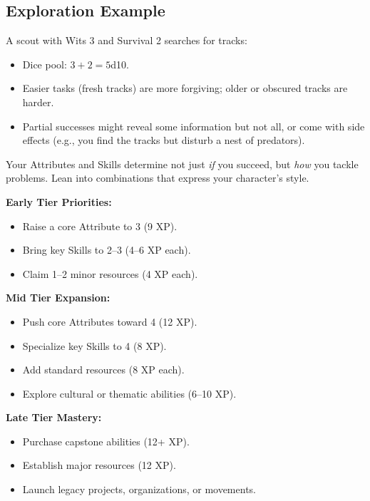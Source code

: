 \subsection{Exploration Example}
\label{sec:exploration-example}
A scout with Wits 3 and Survival 2 searches for tracks:
\begin{itemize}
  \item Dice pool: $3 + 2 = 5$d10.
  \item Easier tasks (fresh tracks) are more forgiving; older or obscured tracks are harder.
  \item Partial successes might reveal some information but not all, or come with side effects (e.g., you find the tracks but disturb a nest of predators).
\end{itemize}

\noindent Your Attributes and Skills determine not just \emph{if} you succeed, but
\emph{how} you tackle problems. Lean into combinations that express your
character's style.

\begin{tcolorbox}[colback=green!5!white,colframe=green!75!black,title=XP Planning Guide,fonttitle=\bfseries,breakable]
\textbf{Early Tier Priorities:}
\begin{itemize}
  \item Raise a core Attribute to 3 (9 XP).
  \item Bring key Skills to 2--3 (4--6 XP each).
  \item Claim 1--2 minor resources (4 XP each).
\end{itemize}

\textbf{Mid Tier Expansion:}
\begin{itemize}
  \item Push core Attributes toward 4 (12 XP).
  \item Specialize key Skills to 4 (8 XP).
  \item Add standard resources (8 XP each).
  \item Explore cultural or thematic abilities (6--10 XP).
\end{itemize}

\textbf{Late Tier Mastery:}
\begin{itemize}
  \item Purchase capstone abilities (12+ XP).
  \item Establish major resources (12 XP).
  \item Launch legacy projects, organizations, or movements.
\end{itemize}
\end{tcolorbox}

